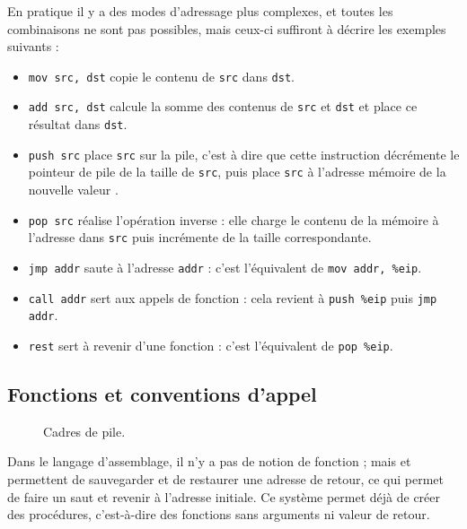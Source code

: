 En pratique il y a des modes d'adressage plus complexes, et toutes les
combinaisons ne sont pas possibles, mais ceux-ci suffiront à décrire les
exemples suivants :

\begin{itemize}

\item \texttt{mov src, dst} copie le contenu de \texttt{src} dans \texttt{dst}.

\item \texttt{add src, dst} calcule la somme des contenus de \texttt{src} et
  \texttt{dst} et place ce résultat dans \texttt{dst}.

\item \texttt{push src} place \texttt{src} sur la pile, c'est à dire que cette
  instruction décrémente le pointeur de pile \esp de la taille de \texttt{src},
  puis place \texttt{src} à l'adresse mémoire de la nouvelle valeur \esp.

\item \texttt{pop src} réalise l'opération inverse : elle charge le contenu de
  la mémoire à l'adresse \esp dans \texttt{src} puis incrémente \esp de la
  taille correspondante.

\item \texttt{jmp addr} saute à l'adresse \texttt{addr} : c'est l'équivalent de
  \texttt{mov addr, \%eip}.

\item \texttt{call addr} sert aux appels de fonction : cela revient à
  \texttt{push \%eip} puis \texttt{jmp addr}.

\item \texttt{rest} sert à revenir d'une fonction : c'est l'équivalent de
  \texttt{pop \%eip}.

\end{itemize}

\subsection{Fonctions et conventions d'appel}

\begin{figure} %

\caption[Cadres de pile]{ Cadres de pile. }
\label{fig:stackframe}
\end{figure} %

Dans le langage d'assemblage, il n'y a pas de notion de fonction ; mais
 et  permettent de sauvegarder et de restaurer une
adresse de retour, ce qui permet de faire un saut et revenir à l'adresse initiale.
Ce système permet déjà de créer des procédures, c'est-à-dire des fonctions sans
arguments ni valeur de retour.


